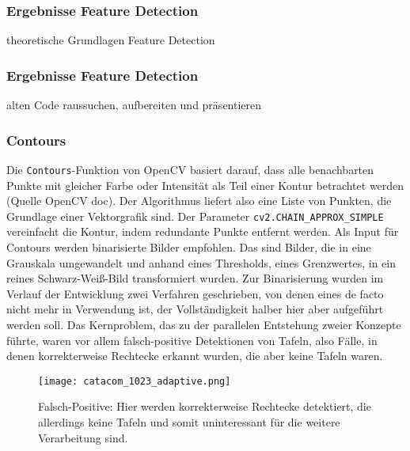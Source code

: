 \subsubsection{Ergebnisse Feature Detection}

theoretische Grundlagen Feature Detection\\

\subsubsection{Ergebnisse Feature Detection}

alten Code raussuchen, aufbereiten und präsentieren\\

\subsubsection{Contours}

Die \verb|Contours|-Funktion von OpenCV basiert darauf, dass alle benachbarten Punkte mit gleicher Farbe oder Intensität als Teil einer Kontur betrachtet werden (Quelle OpenCV doc). Der Algorithmus liefert also eine Liste von Punkten, die Grundlage einer Vektorgrafik sind. Der Parameter \verb|cv2.CHAIN_APPROX_SIMPLE| vereinfacht die Kontur, indem redundante Punkte entfernt werden. Als Input für Contours werden binarisierte Bilder empfohlen. Das sind Bilder, die in eine Grauskala umgewandelt  und anhand eines Thresholds, eines Grenzwertes, in ein reines Schwarz-Weiß-Bild transformiert wurden. Zur Binarisierung wurden im Verlauf der Entwicklung zwei Verfahren geschrieben, von denen eines de facto nicht mehr in Verwendung ist, der Vollständigkeit halber hier aber aufgeführt werden soll.
Das Kernproblem, das zu der parallelen Entstehung zweier Konzepte führte, waren vor allem falsch-positive Detektionen von Tafeln, also Fälle, in denen korrekterweise Rechtecke erkannt wurden, die aber keine Tafeln waren.
\begin{SCfigure}[0.5][h!]
\caption{Falsch-Positive: Hier werden korrekterweise Rechtecke detektiert, die allerdings keine Tafeln und somit uninteressant für die weitere Verarbeitung sind.}
\texttt{[image: catacom\_1023\_adaptive.png]}
\end{SCfigure}

